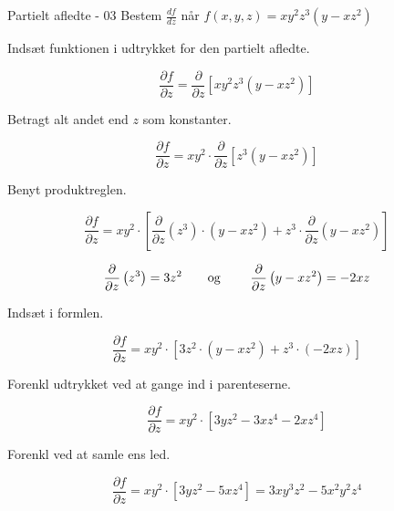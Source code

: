 \documentclass{article}
\begin{document}
\begin{exercise}{Partielt afledte - 03}
	Bestem $\frac{df}{dz}$ når $f(x,y,z) = xy^2z^3\left(y-xz^2\right)$ 
	
	
	\hint
	Indsæt funktionen i udtrykket for den partielt afledte.
	
	\hint
	
	\[
	\frac{\partial f}{\partial z} = \frac{\partial }{\partial z} \left[xy^2z^3\left(y-xz^2\right)\right]
	\]
	
	\hint
	Betragt alt andet end $z$ som konstanter.
	
	\hint
	\[
	\frac{\partial f}{\partial z} = xy^2 \cdot \frac{\partial }{\partial z} \left[ z^3\left(y-xz^2 \right) \right]
	\]
	
	\hint
	
	Benyt produktreglen.
	
	\hint
	\[
	\frac{\partial f}{\partial z} = xy^2 \cdot \left[\frac{\partial }{\partial z}\left(z^3 \right) \cdot \left( y-xz^2 \right) + z^3 \cdot \frac{\partial}{\partial z} \left(y-xz^2\right) \right]
	\]
	
	\hint
	\[\frac{\partial }{\partial z} \left(z^3\right) = 3z^2 \textrm{\qquad og \qquad} \frac{\partial }{\partial z} \left(y-xz^2\right) = -2xz
	\]
	
	\hint
	Indsæt i formlen.
	
	\hint
	\[
	\frac{\partial f}{\partial z} = xy^2 \cdot \left[3z^2 \cdot \left( y-xz^2 \right) + z^3 \cdot (-2xz) \right]
	\]
	
	\hint
	Forenkl udtrykket ved at gange ind i parenteserne.
	
	\hint
	\[
	\frac{\partial f}{\partial z} = xy^2 \cdot \left[3yz^2 - 3xz^4 -2xz^4 \right]
	\]
	
	\hint Forenkl ved at samle ens led.
	
	\hint
	\[
	\frac{\partial f}{\partial z} = xy^2 \cdot \left[3yz^2 - 5xz^4\right] = 3xy^3z^2 - 5x^2y^2z^4
	\]
	
\end{exercise}

\newpage
\end{document}
